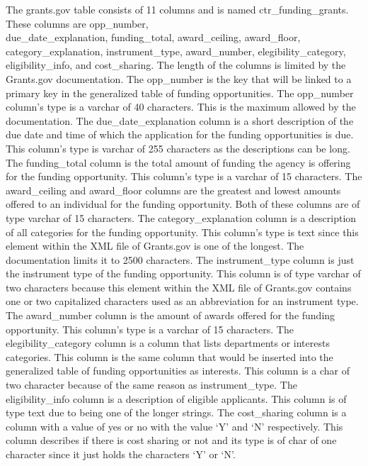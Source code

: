 \documentclass[onecolumn]{IEEEtran}
\begin{document}
The grants.gov table consists of 11 columns and is named ctr\_funding\_grants. These columns are opp\_number, \\
due\_date\_explanation, funding\_total, award\_ceiling, award\_floor, category\_explanation, instrument\_type, award\_number, elegibility\_category, eligibility\_info, and cost\_sharing.  The length of the columns is limited by the Grants.gov documentation. The opp\_number is the key that will be linked to a primary key in the generalized table of funding opportunities. The opp\_number column's type is a varchar of 40 characters. This is the maximum allowed by the documentation. The due\_date\_explanation column is a short description of the due date and time of which the application for the funding opportunities is due. This column's type is varchar of 255 characters as the descriptions can be long. The funding\_total column is the total amount of funding the agency is offering for the funding opportunity. This column's type is a varchar of 15 characters. The award\_ceiling and award\_floor columns are the greatest and lowest amounts offered to an individual for the funding opportunity. Both of these columns are of type varchar of 15 characters. The category\_explanation column is a description of all categories for the funding opportunity. This column's type is text since this element within the XML file of Grants.gov is one of the longest. The documentation limits it to 2500 characters. The instrument\_type column is just the instrument type of the funding opportunity. This column is of type varchar of two characters because this element within the XML file of Grants.gov contains one or two capitalized characters used as an abbreviation for an instrument type. The award\_number column is the amount of awards offered for the funding opportunity. This column's type is a varchar of 15 characters. The elegibility\_category column is a column that lists departments or interests categories. This column is the same column that would be inserted into the generalized table of funding opportunities as interests. This column is a char of two character because of the same reason as instrument\_type. The eligibility\_info column is a description of eligible applicants. This column is of type text due to being one of the longer strings. The cost\_sharing column is a column with a value of yes or no with the value `Y' and `N' respectively. This column describes if there is cost sharing or not and its type is of char of one character since it just holds the characters `Y' or `N'.
\end{document}
